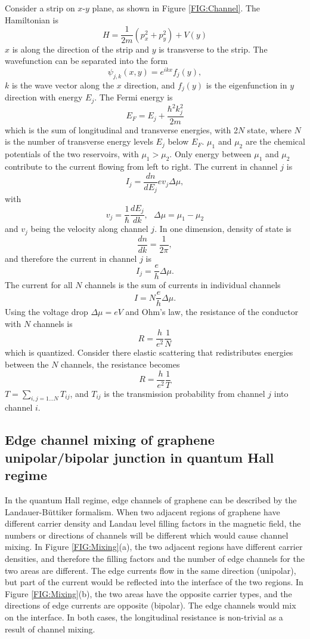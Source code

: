 \documentclass[pdflatex, sectionletters, 12pt, final, phd]{pittetd}    %
\begin{document}
Consider a strip on $x$-$y$ plane, as shown in Figure \ref{FIG:Channel}. The Hamiltonian is
$$
H = \frac{1}{2m}\left(p_x^2 + p_y^2\right) + V(y)
$$ 
$x$ is along the direction of the strip and $y$ is transverse to the strip. The wavefunction can be separated into the form
$$
\psi_{j, k}(x, y) = e^{ikx} f_j(y),
$$
$k$ is the wave vector along the $x$ direction, and $f_j(y)$ is the eigenfunction in $y$ direction with energy $E_j$. The Fermi energy is 
$$
E_F = E_j + \frac{\hbar^2 k_j^2}{2m}
$$
which is the sum of longitudinal and transverse energies, with 2$N$ state, where $N$ is the number of transverse energy levels $E_j$ below $E_F$. $\mu_1$ and $\mu_2$ are the chemical potentials of the two reservoirs, with $\mu_1 > \mu_2$. Only energy between $\mu_1$ and $\mu_2$ contribute to the current flowing from left to right. The current in channel $j$ is 
$$
I_j = \frac{dn}{dE_j}ev_j\Delta\mu,
$$
with 
$$
v_j = \frac{1}{\hbar}\frac{dE_j}{dk}, \ \ \ \Delta \mu = \mu_1 - \mu_2
$$
and $v_j$ being the velocity along channel $j$. In one dimension, density of state is
$$
\frac{dn}{dk} = \frac{1}{2\pi},
$$
and therefore the current in channel $j$ is
$$
I_j = \frac{e}{h}\Delta\mu.
$$
The current for all $N$ channels is the sum of currents in individual channels
$$I = N\frac{e}{h}\Delta\mu.$$
Using the voltage drop $\Delta \mu = eV$ and Ohm's law, the resistance of the conductor with $N$ channels is
$$
R = \frac{h}{e^2}\frac{1}{N}
$$ 
which is quantized. Consider there elastic scattering that redistributes energies between the $N$ channels, the resistance becomes\cite{buttiker1988absence}
$$
R = \frac{h}{e^2}\frac{1}{T}
$$
$T = \sum_{i,j=1\ldots N} T_{ij}$, and $T_{ij}$ is the transmission probability from channel $j$ into channel $i$. 

\subsection{Edge channel mixing of graphene unipolar/bipolar junction in quantum Hall regime}

In the quantum Hall regime, edge channels of graphene can be described by the Landauer-B{\"u}ttiker formalism. When two adjacent regions of graphene have different carrier density and Landau level filling factors in the magnetic field, the numbers or directions of channels will be different which would cause channel mixing. In Figure \ref{FIG:Mixing}(a), the two adjacent regions have different carrier densities, and therefore the filling factors and the number of edge channels for the two areas are different. The edge currents flow in the same direction (unipolar), but part of the current would be reflected into the interface of the two regions. In Figure \ref{FIG:Mixing}(b), the two areas have the opposite carrier types, and the directions of edge currents are opposite (bipolar). The edge channels would mix on the interface. In both cases, the longitudinal resistance is non-trivial as a result of channel mixing.
\end{document}
